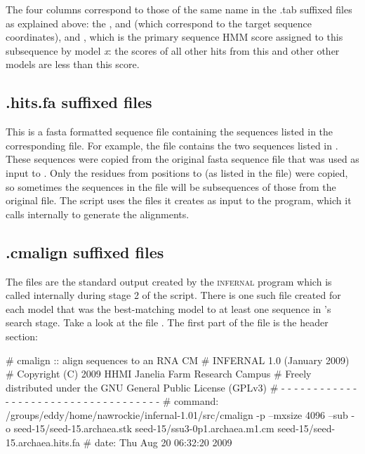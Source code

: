The four columns correspond to those of the same name in the {.tab}
suffixed files as explained above: the ,
 and  (which correspond to the target sequence
coordinates), and , which is the primary sequence HMM
score assigned to this subsequence by model \emph{x}: the scores of
all other hits from this and other other models are less than
this score.

\subsection{.hits.fa suffixed files}
This is a fasta formatted sequence file containing the sequences
listed in the corresponding  file. For example, the
file  contains the two sequences
listed in . These sequences were
copied from the original fasta sequence file  that
was used as input to . Only the residues from
positions  to  (as listed in the
 file) were copied, so sometimes the sequences in the
 file will be subsequences of those from the original
file.  The  script uses the  files it
creates as input to the  program, which it calls
internally to generate the alignments.

\subsection{.cmalign suffixed files}

The  files are the standard output created by the
\textsc{infernal} program  which is called internally
during stage 2 of the  script. There is one such file
created for each model that was the best-matching model to at least
one sequence in 's search stage. Take a look at the
file . The first part of the file
is the header section:

\begin{sreoutput}
# cmalign :: align sequences to an RNA CM
# INFERNAL 1.0 (January 2009)
# Copyright (C) 2009 HHMI Janelia Farm Research Campus
# Freely distributed under the GNU General Public License (GPLv3)
# - - - - - - - - - - - - - - - - - - - - - - - - - - - - - - - - - - - -
# command: /groups/eddy/home/nawrockie/infernal-1.01/src/cmalign -p --mxsize 4096 --sub -o seed-15/seed-15.archaea.stk seed-15/ssu3-0p1.archaea.m1.cm seed-15/seed-15.archaea.hits.fa
# date:    Thu Aug 20 06:32:20 2009
\end{sreoutput}

